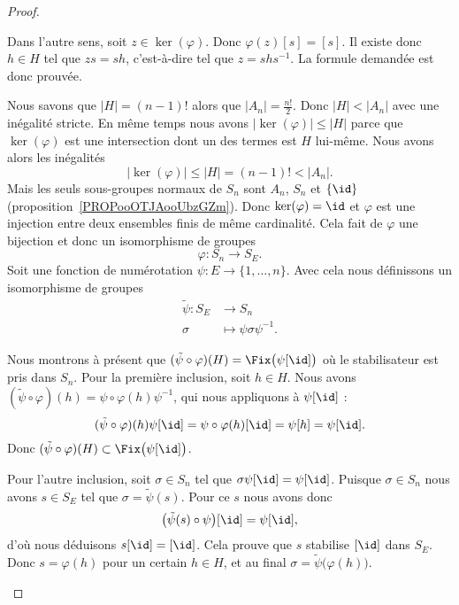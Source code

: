 \begin{proof}
\begin{subproof}
\begin{subproof}
			Dans l'autre sens, soit \( z\in\ker(\varphi)\). Donc \( \varphi(z)[s]=[s]\). Il existe donc \( h\in H\) tel que \( zs=sh\), c'est-à-dire tel que \( z=shs^{-1}\). La formule demandée est donc prouvée.


			Nous savons que \( | H |=(n-1)!\) alors que \( | A_n |=\frac{ n! }{2}\). Donc \( | H |<| A_n |\) avec une inégalité stricte. En même temps nous avons \( | \ker(\varphi) |\leq | H |\) parce que \( \ker(\varphi)\) est une intersection dont un des termes est \( H\) lui-même. Nous avons alors les inégalités
			\begin{equation}
				| \ker(\varphi) |\leq | H |=(n-1)!<| A_n |.
			\end{equation}
			Mais les seuls sous-groupes normaux de \( S_n\) sont \( A_n\), \( S_n\) et \( \{ \id \}\) (proposition~\ref{PROPooOTJAooUbzGZm}). Donc \( \ker(\varphi)=\id\) et \( \varphi\) est une injection entre deux ensembles finis de même cardinalité. Cela fait de \( \varphi\) une bijection et donc un isomorphisme de groupes
			\begin{equation}
				\varphi\colon S_n\to S_E.
			\end{equation}
			Soit une fonction de numérotation \( \psi\colon E\to \{ 1,\ldots, n \}\). Avec cela nous définissons un isomorphisme de groupes
			\begin{equation}
				\begin{aligned}
					\tilde \psi\colon S_E & \to S_n                      \\
					\sigma                & \mapsto \psi\sigma\psi^{-1}.
				\end{aligned}
			\end{equation}

			\spitem[Fixateur]

			Nous montrons à présent que \( (\tilde \psi\circ\varphi)(H)=\Fix\big( \psi[\id] \big)\) où le stabilisateur est pris dans \( S_n\). Pour la première inclusion, soit \( h\in H\). Nous avons \( (\tilde \psi\circ\varphi)(h)=\psi\circ\varphi(h)\psi^{-1}\), qui nous appliquons à \( \psi[\id]\) :
			\begin{equation}
				(\tilde \psi\circ\varphi)(h)\psi[\id]=\psi\circ\varphi(h)[\id]=\psi[h]=\psi[\id].
			\end{equation}
			Donc \( (\tilde \psi\circ\varphi)(H)\subset\Fix\big( \psi[\id] \big)\).

			Pour l'autre inclusion, soit \( \sigma\in S_n\) tel que \( \sigma\psi[\id]=\psi[\id]\). Puisque \( \sigma\in S_n\) nous avons \( s\in S_E\) tel que \( \sigma=\tilde \psi(s)\). Pour ce \( s\) nous avons donc
			\begin{equation}
				\big( \tilde \psi(s)\circ\psi \big)[\id]=\psi[\id],
			\end{equation}
			d'où nous déduisons \( s[\id]=[\id]\). Cela prouve que \( s\) stabilise \( [\id]\) dans \( S_E\). Donc \( s=\varphi(h)\) pour un certain \( h\in H\), et au final \( \sigma=\tilde \psi\big( \varphi(h) \big)\).


\end{subproof}
\end{subproof}
\end{proof}

